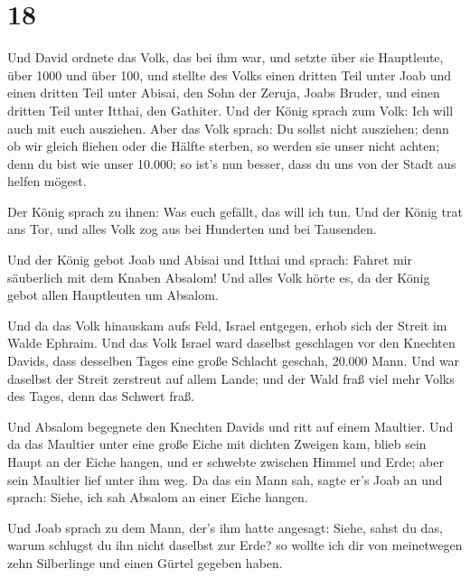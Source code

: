 \hypertarget{section-17}{%
\section{18}\label{section-17}}

 Und David ordnete das Volk, das bei ihm war, und setzte
über sie Hauptleute, über 1000 und über 100,  und stellte
des Volks einen dritten Teil unter Joab und einen dritten Teil unter
Abisai, den Sohn der Zeruja, Joabs Bruder, und einen dritten Teil unter
Itthai, den Gathiter. Und der König sprach zum Volk: Ich will auch mit
euch ausziehen.  Aber das Volk sprach: Du sollst nicht
ausziehen; denn ob wir gleich fliehen oder die Hälfte sterben, so werden
sie unser nicht achten; denn du bist wie unser 10.000; so ist's nun
besser, dass du uns von der Stadt aus helfen mögest.

 Der König sprach zu ihnen: Was euch gefällt, das will ich
tun. Und der König trat ans Tor, und alles Volk zog aus bei Hunderten
und bei Tausenden.

 Und der König gebot Joab und Abisai und Itthai und
sprach: Fahret mir säuberlich mit dem Knaben Absalom! Und alles Volk
hörte es, da der König gebot allen Hauptleuten um Absalom.

 Und da das Volk hinauskam aufs Feld, Israel entgegen,
erhob sich der Streit im Walde Ephraim.  Und das Volk
Israel ward daselbst geschlagen vor den Knechten Davids, dass desselben
Tages eine große Schlacht geschah, 20.000 Mann.  Und war
daselbst der Streit zerstreut auf allem Lande; und der Wald fraß viel
mehr Volks des Tages, denn das Schwert fraß.

 Und Absalom begegnete den Knechten Davids und ritt auf
einem Maultier. Und da das Maultier unter eine große Eiche mit dichten
Zweigen kam, blieb sein Haupt an der Eiche hangen, und er schwebte
zwischen Himmel und Erde; aber sein Maultier lief unter ihm weg.
 Da das ein Mann sah, sagte er's Joab an und sprach:
Siehe, ich sah Absalom an einer Eiche hangen.

 Und Joab sprach zu dem Mann, der's ihm hatte angesagt:
Siehe, sahst du das, warum schlugst du ihn nicht daselbst zur Erde? so
wollte ich dir von meinetwegen zehn Silberlinge und einen Gürtel gegeben
haben.

